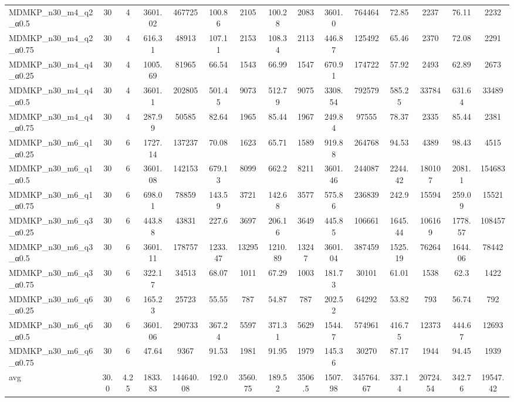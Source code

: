 \begin{table}[!ht]
{\begin{tabular}{lcccccccccccccc}
MDMKP\_n30\_m4\_q2\_α0.5 & 30 & 4 & 3601.02 & 467725 & 100.86 & 2105 & 100.28 & 2083 & 3601.0 & 764464 & 72.85 & 2237 & 76.11 & 2232 \\
MDMKP\_n30\_m4\_q2\_α0.75 & 30 & 4 & 616.31 & 48913 & 107.11 & 2153 & 108.34 & 2113 & 446.87 & 125492 & 65.46 & 2370 & 72.08 & 2291 \\
MDMKP\_n30\_m4\_q4\_α0.25 & 30 & 4 & 1005.69 & 81965 & 66.54 & 1543 & 66.99 & 1547 & 670.91 & 174722 & 57.92 & 2493 & 62.89 & 2673 \\
MDMKP\_n30\_m4\_q4\_α0.5 & 30 & 4 & 3601.1 & 202805 & 501.45 & 9073 & 512.79 & 9075 & 3308.54 & 792579 & 585.25 & 33784 & 631.64 & 33489 \\
MDMKP\_n30\_m4\_q4\_α0.75 & 30 & 4 & 287.99 & 50585 & 82.64 & 1965 & 85.44 & 1967 & 249.84 & 97555 & 78.37 & 2335 & 85.44 & 2381 \\
MDMKP\_n30\_m6\_q1\_α0.25 & 30 & 6 & 1727.14 & 137237 & 70.08 & 1623 & 65.71 & 1589 & 919.88 & 264768 & 94.53 & 4389 & 98.43 & 4515 \\
MDMKP\_n30\_m6\_q1\_α0.5 & 30 & 6 & 3601.08 & 142153 & 679.13 & 8099 & 662.2 & 8211 & 3601.46 & 244087 & 2244.42 & 180107 & 2081.1 & 154683 \\
MDMKP\_n30\_m6\_q1\_α0.75 & 30 & 6 & 698.01 & 78859 & 143.59 & 3721 & 142.68 & 3577 & 575.86 & 236839 & 242.9 & 15594 & 259.09 & 15521 \\
MDMKP\_n30\_m6\_q3\_α0.25 & 30 & 6 & 443.88 & 43831 & 227.6 & 3697 & 206.16 & 3649 & 445.85 & 106661 & 1645.44 & 106169 & 1778.57 & 108457 \\
MDMKP\_n30\_m6\_q3\_α0.5 & 30 & 6 & 3601.11 & 178757 & 1233.47 & 13295 & 1210.89 & 13247 & 3601.04 & 387459 & 1525.19 & 76264 & 1644.06 & 78442 \\
MDMKP\_n30\_m6\_q3\_α0.75 & 30 & 6 & 322.17 & 34513 & 68.07 & 1011 & 67.29 & 1003 & 181.73 & 30101 & 61.01 & 1538 & 62.3 & 1422 \\
MDMKP\_n30\_m6\_q6\_α0.25 & 30 & 6 & 165.23 & 25723 & 55.55 & 787 & 54.87 & 787 & 202.52 & 64292 & 53.82 & 793 & 56.74 & 792 \\
MDMKP\_n30\_m6\_q6\_α0.5 & 30 & 6 & 3601.06 & 290733 & 367.24 & 5597 & 371.31 & 5629 & 1544.7 & 574961 & 416.75 & 12373 & 444.67 & 12693 \\
MDMKP\_n30\_m6\_q6\_α0.75 & 30 & 6 & 47.64 & 9367 & 91.53 & 1981 & 91.95 & 1979 & 145.36 & 30270 & 87.17 & 1944 & 94.45 & 1939 \\
\hline avg & 30.0 & 4.25 & 1833.83& 144640.08 & 192.0& 3560.75 & 189.52& 3506.5 & 1507.98& 345764.67 & 337.14& 20724.54 & 342.76& 19547.42\\ \hline

\end{tabular}}
\end{table}
